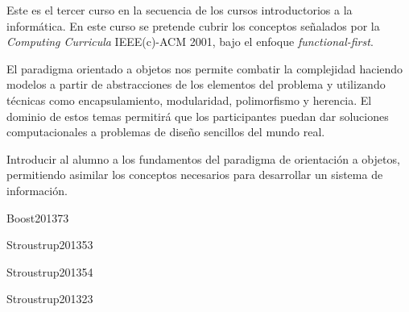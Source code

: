 \begin{syllabus}


\begin{justification}
Este es el tercer curso en la secuencia de los cursos introductorios a la informática. En este curso se pretende cubrir los conceptos señalados por la \textit{Computing Curricula} IEEE(c)-ACM 2001, bajo el enfoque \textit{functional-first}. 

El paradigma orientado a objetos nos permite combatir la
complejidad haciendo modelos a partir de abstracciones de los elementos del problema y utilizando técnicas como encapsulamiento,
modularidad, polimorfismo y herencia. El dominio de estos temas permitirá que los participantes puedan dar soluciones computacionales a problemas de diseño sencillos del mundo real.
\end{justification}

\begin{goals}
\item Introducir al alumno a los fundamentos del paradigma de orientación a objetos, permitiendo asimilar los conceptos necesarios para desarrollar un sistema de información.
\end{goals}

\begin{outcomes}
\end{outcomes}

\begin{unit}{\DSGraphsAndTreesDef}{Boost2013}{7}{3}
    \DSGraphsAndTreesAllTopics
    \DSGraphsAndTreesAllObjectives
\end{unit}

\begin{unit}{\PFFundamentalConstructsDef}{Stroustrup2013}{5}{3}
    \PFFundamentalConstructsAllTopics
    \PFFundamentalConstructsAllObjectives
\end{unit}

\begin{unit}{\PFAlgorithmsAndProblemSolvingDef}{Stroustrup2013}{5}{4}
    \PFAlgorithmsAndProblemSolvingAllTopics
    \PFAlgorithmsAndProblemSolvingAllObjectives
\end{unit}

\begin{unit}{\PFEventDrivenProgrammingDef}{Stroustrup2013}{2}{3}
   \PFEventDrivenProgrammingAllTopics
   \PFEventDrivenProgrammingAllObjectives
\end{unit}


\end{syllabus}
